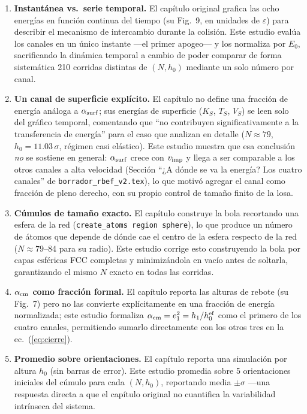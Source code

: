 \documentclass[11pt,a4paper]{article}
\newcommand{\eps}{\varepsilon}
\begin{document}
\begin{enumerate}[leftmargin=1.4em]

\item \textbf{Instantánea vs.\ serie temporal.} El capítulo original
grafica las ocho energías en función continua del tiempo (su Fig.~9,
en unidades de $\eps$) para describir el mecanismo de intercambio durante
la colisión. Este estudio evalúa los canales en un único instante ---el
primer apogeo--- y los normaliza por $E_0$, sacrificando la dinámica
temporal a cambio de poder comparar de forma sistemática 210 corridas
distintas de $(N,h_0)$ mediante un solo número por canal.

\item \textbf{Un canal de superficie explícito.} El capítulo no define una
fracción de energía análoga a $\alpha_{\rm surf}$; sus energías de
superficie ($K_S$, $T_S$, $V_S$) se leen solo del gráfico temporal,
comentando que ``no contribuyen significativamente a la transferencia de
energía'' para el caso que analizan en detalle ($N\approx79$,
$h_0=11.03\,\sigma$, régimen casi elástico). Este estudio muestra que esa
conclusión \emph{no} se sostiene en general: $\alpha_{\rm surf}$ crece con
$v_{\rm imp}$ y llega a ser comparable a los otros canales a alta
velocidad (Sección ``¿A dónde se va la energía? Los cuatro canales'' de
\texttt{borrador\_rbef\_v2.tex}), lo que motivó agregar el canal como
fracción de pleno derecho, con su propio control de tamaño finito de la
losa.

\item \textbf{Cúmulos de tamaño exacto.} El capítulo construye la bola
recortando una esfera de la red (\texttt{create\_atoms region sphere}),
lo que produce un número de átomos que depende de dónde cae el centro de
la esfera respecto de la red ($N\approx79$--84 para su radio). Este
estudio corrige esto construyendo la bola por capas esféricas FCC
completas y minimizándola en vacío antes de soltarla, garantizando el
mismo $N$ exacto en todas las corridas.

\item \textbf{$\alpha_{\rm cm}$ como fracción formal.} El capítulo
reporta las alturas de rebote (su Fig.~7) pero no las convierte
explícitamente en una fracción de energía normalizada; este estudio
formaliza $\alpha_{\rm cm}=e_1^2=h_1/h_0^{\rm ef}$ como el primero de los
cuatro canales, permitiendo sumarlo directamente con los otros tres en la
ec.~(\ref{eq:cierre}).

\item \textbf{Promedio sobre orientaciones.} El capítulo reporta una
simulación por altura $h_0$ (sin barras de error). Este estudio promedia
sobre 5 orientaciones iniciales del cúmulo para cada $(N,h_0)$, reportando
media $\pm\sigma$ ---una respuesta directa a que el capítulo original no
cuantifica la variabilidad intrínseca del sistema.

\end{enumerate}
\end{document}
